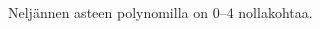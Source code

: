 \begin{esimerkki} Neljännen asteen polynomilla on $0$--$4$ nollakohtaa.

\begin{lukusuora}{-4}{4}{3.6}
\end{lukusuora}
\begin{lukusuora}{-4}{4}{3.6}
\end{lukusuora}
\begin{lukusuora}{-4}{4}{3.6}
\end{lukusuora}

\begin{lukusuora}{-4}{4}{3.6}
\end{lukusuora}
\begin{lukusuora}{-2.8}{2.8}{3.6}
\end{lukusuora}

\end{esimerkki}